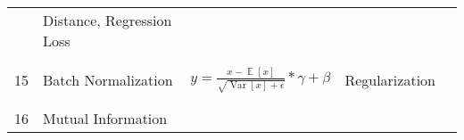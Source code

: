 \documentclass[twoside,twocolumn]{article}
\begin{document}
\begin{table}
{\begin{tabular}{p{0.2cm} p{6cm} p{12cm} p{6cm} p{4cm}}
            & Distance, Regression Loss      &
    \\ \\ \\
    15 &  Batch Normalization
      & $\displaystyle y = \frac{x - \mathop{\mathbb{E}} \left[ x \right]}{\sqrt{\operatorname{Var}\left[ x \right] + \epsilon}} \ast \gamma + \beta$      & Regularization      &
    \\ \\ \\
    16 &  Mutual Information
      &       &       &
    \\
    \bottomrule
  \end{tabular}
  }
  \caption{}
  \label{}

\end{table}


% 
% 

\end{document}

